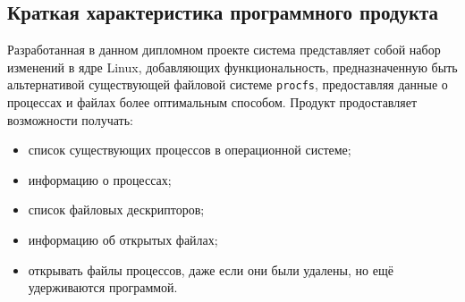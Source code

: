









\FPround{}


\subsection{Краткая характеристика программного продукта}

Разработанная в данном дипломном проекте система представляет собой набор
изменений в ядре Linux, добавляющих функциональность, предназначенную быть
альтернативой существующей файловой системе \texttt{procfs}, предоставляя данные
о процессах и файлах более оптимальным способом. Продукт продоставляет
возможности получать:
\begin{itemize}
\item список существующих процессов в операционной системе;
\item информацию о процессах;
\item список файловых дескрипторов;
\item информацию об открытых файлах;
\item открывать файлы процессов, даже если они были удалены, но ещё удерживаются
  программой.
\end{itemize}

